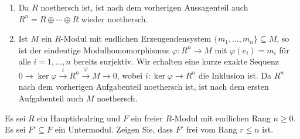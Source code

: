 \begin{solution}
\begin{enumerate}
    \item
      Da $R$ noethersch ist, ist nach dem vorherigen Aussagenteil auch $R^n = R \oplus \dotsb \oplus R$ wieder noethersch.
      
    \item
      Ist $M$ ein $R$-Modul mit endlichen Erzeugendensystem $\{m_1, \dotsc, m_n\} \subseteq M$, so ist der eindeutige Modulhomomorphismus $\varphi \colon R^n \to M$ mit $\varphi(e_i) = m_i$ für alle $i = 1, \dotsc, n$ bereits surjektiv.
      Wir erhalten eine kurze exakte Sequenz $0 \to \ker \varphi \xrightarrow{i} R^n \xrightarrow{\varphi} M \to 0$, wobei $i \colon \ker \varphi \to R^n$ die Inklusion ist.
      Da $R^n$ nach dem vorherigen Aufgabenteil noethersch ist, ist nach dem ersten Aufgabenteil auch $M$ noethersch.
  \end{enumerate}
\end{solution}


\begin{question}[subtitle = Untermoduln freier Moduln über Hauptidealringen]
  \label{question: submodules of free modules over pid are also free}
  Es sei $R$ ein Hauptidealring und $F$ ein freier $R$-Modul mit endlichen Rang $n \geq 0$.
  Es sei $F' \subseteq F$ ein Untermodul.
  Zeigen Sie, dass $F'$ frei vom Rang $r \leq n$ ist.
\end{question}


